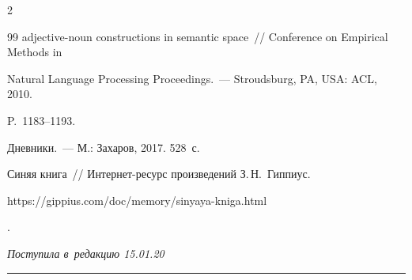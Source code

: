 \begin{multicols}{2}
{{\begin{thebibliography}{99}
adjective-noun constructions in semantic space~// Conference on Empirical Methods in 


Natural Language Processing Proceedings.~--- Stroudsburg, PA, USA: ACL, 2010.  


P.~1183--1193.




 Дневники.~--- М.: Захаров, 2017. 528~с.




Синяя книга~// Ин\-тер\-нет-ре\-сурс произведений З.\,Н.~Гип\-пи\-ус. {\sf 


https://gippius.com/doc/memory/\linebreak sinyaya-kniga.html}.


 \end{thebibliography}





 }


 }





\end{multicols}





\vspace*{-9pt}





\hfill{\small\textit{Поступила в~редакцию 15.01.20}}





\vspace*{6pt}




















\hrule





\vspace*{2pt}





